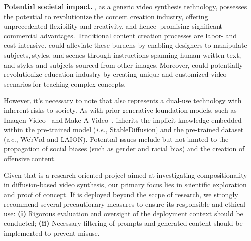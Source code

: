 \textbf{Potential societal impact.}
\method, as a generic video synthesis technology, possesses the potential to revolutionize the content creation industry, offering unprecedented flexibility and creativity, and hence, promising significant commercial advantages. 
Traditional content creation processes are labor- and cost-intensive. 
\method could alleviate these burdens by enabling designers to manipulate subjects, styles, and scenes through instructions spanning human-written text, and styles and subjects sourced from other images.
Moreover, \method could potentially revolutionize education industry by creating unique and customized video scenarios for teaching complex concepts.



However, it's necessary to note that \method also represents a dual-use technology with inherent risks to society. 
As with prior generative foundation models, such as Imagen Video~\cite{ho2022imagenvideo} and Make-A-Video~\cite{singer2022make-a-video}, \method inherits the implicit knowledge embedded within the pre-trained model (\textit{i.e.}, StableDiffusion) and the pre-trained dataset (\textit{i.e.}, WebVid and LAION). Potential issues include but not limited to the propagation of social biases (such as gender and racial bias) and the creation of offensive content.

Given that \method is a research-oriented project aimed at investigating compositionality in diffusion-based video synthesis, our primary focus lies in scientific exploration and proof of concept. 
If \method is deployed beyond the scope of research, we strongly recommend several precautionary measures to ensure its responsible and ethical use:
\textbf{(i)} Rigorous evaluation and oversight of the deployment context should be conducted;
\textbf{(ii)} Necessary filtering of prompts and generated content should be implemented to prevent misuse.







%
